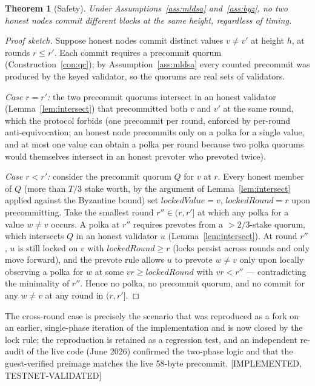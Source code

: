 \documentclass[11pt]{article}
\newcommand{\statusV}{\textcolor{statgreen}{\textsf{\scriptsize[IMPLEMENTED, TESTNET-VALIDATED]}}}
\theoremstyle{plain}
\newtheorem{theorem}{Theorem}[section]
\theoremstyle{definition}
\theoremstyle{remark}
\begin{document}
\begin{theorem}[Safety]
\label{thm:safety}
Under Assumptions~\ref{ass:mldsa} and~\ref{ass:byz}, no two honest nodes
commit different blocks at the same height, regardless of timing.
\end{theorem}

\begin{proof}[Proof sketch]
Suppose honest nodes commit distinct values $v \ne v'$ at height $h$, at
rounds $r \le r'$. Each commit requires a precommit quorum
(Construction~\ref{con:qc}); by Assumption~\ref{ass:mldsa} every counted
precommit was produced by the keyed validator, so the quorums are real sets
of validators.

\emph{Case $r = r'$:} the two precommit quorums intersect in an honest
validator (Lemma~\ref{lem:intersect}) that precommitted both $v$ and $v'$ at
the same round, which the protocol forbids (one precommit per round,
enforced by per-round anti-equivocation; an honest node precommits only on a
polka for a single value, and at most one value can obtain a polka per round
because two polka quorums would themselves intersect in an honest prevoter
who prevoted twice).

\emph{Case $r < r'$:} consider the precommit quorum $Q$ for $v$ at $r$. Every
honest member of $Q$ (more than $T/3$ stake worth, by the argument of
Lemma~\ref{lem:intersect} applied against the Byzantine bound) set
$\mathit{lockedValue} = v$, $\mathit{lockedRound} = r$ upon precommitting.
Take the smallest round $r'' \in (r, r']$ at which any polka for a value
$w \ne v$ occurs. A polka at $r''$ requires prevotes from a $>\!2/3$-stake
quorum, which intersects $Q$ in an honest validator $u$
(Lemma~\ref{lem:intersect}). At round $r''$, $u$ is still locked on $v$ with
$\mathit{lockedRound} \ge r$ (locks persist across rounds and only move
forward), and the prevote rule allows $u$ to prevote $w \ne v$ only upon
locally observing a polka for $w$ at some $vr \ge \mathit{lockedRound}$ with
$vr < r''$ --- contradicting the minimality of $r''$. Hence no polka, no
precommit quorum, and no commit for any $w \ne v$ at any round in
$(r, r']$.
\end{proof}

The cross-round case is precisely the scenario that was reproduced as a fork
on an earlier, single-phase iteration of the implementation and is now closed
by the lock rule; the reproduction is retained as a regression test, and an
independent re-audit of the live code (June 2026) confirmed the two-phase
logic and that the guest-verified preimage matches the live 58-byte
precommit. \statusV{}
\end{document}
